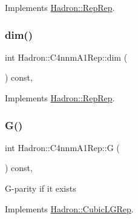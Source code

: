 Implements \mbox{\hyperlink{structHadron_1_1RepRep_a92c8802e5ed7afd7da43ccfd5b7cd92b}{Hadron\+::\+Rep\+Rep}}.

\mbox{\label{structHadron_1_1C4nnmA1Rep_ac851ccfb20da4cca1b97a6279b414442}} 
\subsubsection{\texorpdfstring{dim()}{dim()}\hspace{0.1cm}{\footnotesize\ttfamily [3/3]}}
{\footnotesize\ttfamily int Hadron\+::\+C4nnm\+A1\+Rep\+::dim (\begin{DoxyParamCaption}{ }\end{DoxyParamCaption}) const\hspace{0.3cm}{\ttfamily [inline]}, {\ttfamily [virtual]}}



Implements \mbox{\hyperlink{structHadron_1_1RepRep_a92c8802e5ed7afd7da43ccfd5b7cd92b}{Hadron\+::\+Rep\+Rep}}.

\mbox{\label{structHadron_1_1C4nnmA1Rep_a6513c68696ac96b69cbe1e429364d99c}} 
\subsubsection{\texorpdfstring{G()}{G()}\hspace{0.1cm}{\footnotesize\ttfamily [1/2]}}
{\footnotesize\ttfamily int Hadron\+::\+C4nnm\+A1\+Rep\+::G (\begin{DoxyParamCaption}{ }\end{DoxyParamCaption}) const\hspace{0.3cm}{\ttfamily [inline]}, {\ttfamily [virtual]}}

G-\/parity if it exists 

Implements \mbox{\hyperlink{structHadron_1_1CubicLGRep_ace26f7b2d55e3a668a14cb9026da5231}{Hadron\+::\+Cubic\+L\+G\+Rep}}.

\mbox{\label{structHadron_1_1C4nnmA1Rep_a6513c68696ac96b69cbe1e429364d99c}} 
